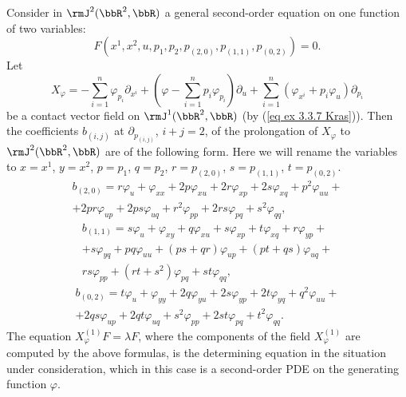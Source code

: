\begin{example}
    Consider in $\rmJ^2(\bbR^2,\bbR)$ a general second-order equation on one function of two variables:
    \[F(x^1,x^2,u,p_1,p_2,p_{(2,0)},p_{(1,1)},p_{(0,2)})=0.\]
    Let 
    \[X_\varphi=-\sum_{i=1}^n \varphi_{p_i}\partial_{x^i}+\left(\varphi-\sum_{i=1}^n p_i\varphi_{p_i}\right)\partial_u+\sum_{i=1}^n \left(\varphi_{x^i}+p_i\varphi_u\right)\partial_{p_i}\]
    be a contact vector field on $\rmJ^1(\bbR^2,\bbR)$ (by (\ref{eq ex 3.3.7 Kras})). Then the coefficients $b_{(i,j)}$ at $\partial_{p_{(i,j)}}$, $i+j=2$, of the prolongation of $X_\varphi$ to $\rmJ^2(\bbR^2,\bbR)$ are of the following form. Here we will rename the variables to $x=x^1$, $y=x^2$, $p=p_1$, $q=p_2$, $r=p_{(2,0)}$, $s=p_{(1,1)}$, $t=p_{(0,2)}$.
    \begin{multline}
        b_{(2,0)}=r\varphi_u+\varphi_{xx}+2p\varphi_{xu}+2r\varphi_{xp}+2s \varphi_{xq}+p^2\varphi_{uu}+\\
        +2pr\varphi_{up}+2ps\varphi_{uq}+r^2\varphi_{pp}+2rs\varphi_{pq}+s^2\varphi_{qq},
    \end{multline}
    \begin{multline}
        b_{(1,1)}=s\varphi_u+\varphi_{xy}+q\varphi_{xu}+s\varphi_{xp}+t\varphi_{xq}+r\varphi_{yp}+\\
        +s\varphi_{yq}+pq\varphi_{uu}+(ps+qr)\varphi_{up}+(pt+qs)\varphi_{uq}+\\
        rs\varphi_{pp}+(rt+s^2)\varphi_{pq}+st\varphi_{qq},
    \end{multline}
    \begin{multline}
        b_{(0,2)}=t\varphi_u+\varphi_{yy}+2q\varphi_{yu}+2s\varphi_{yp}+2t\varphi_{yq}+q^2\varphi_{uu}+\\
        +2qs\varphi_{up}+2qt\varphi_{uq}+s^2\varphi_{pp}+2st\varphi_{pq}+t^2\varphi_{qq}.
    \end{multline}
    The equation $X_\varphi^{(1)}F=\lambda F$, where the components of the field $X_\varphi^{(1)}$ are computed by the above formulas, is the determining equation in the situation under consideration, which in this case is a second-order PDE on the generating function $\varphi$.
\end{example}

